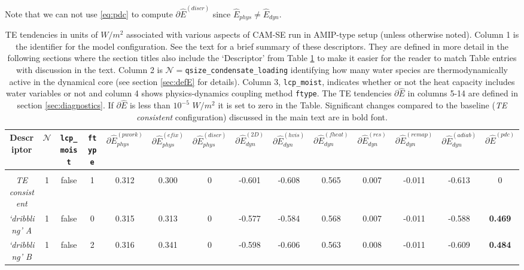 \documentclass[draft,linenumbers]{agujournal}
\newcommand*{\gi}[1]{\widehat{#1}}
\begin{document}
Note that we can not use \eqref{eq:pdc} to compute $\partial \gi{E}^{({discr})}$ since $\gi{E}_{phys}\neq \gi{E}_{dyn}$.
%
\begin{table}
  \caption{TE tendencies in units of $W/m^2$ associated with various aspects of CAM-SE run in AMIP-type setup (unless otherwise noted). Column 1 is the identifier for the model configuration. See the text for a brief summary of these descriptors. They are defined in more detail in the following sections where the section titles also include the `Descriptor' from Table \ref{table:TE} to make it easier for the reader to match Table entries with discussion in the text. Column 2 is $\mathcal{N}=${\tt{qsize\_condensate\_loading}} identifying how many water species are thermodynamically{\color{red}{/inertially}} active in the dynamical core (see section \ref{sec:defE} for details). Column 3, {\tt{lcp\_moist}}, indicates whether or not the heat capacity includes water variables or not and column 4 shows physics-dynamics coupling method {\tt{ftype}}. The TE tendencies $\partial \gi{E}$ in columns 5-14 are defined in section \ref{sec:diagnostics}. If $\partial \gi{E}$ is less than $10^{-5}$ $W/m^2$ it is set to zero in the Table. Significant changes compared to the baseline ({\em{TE consistent}} configuration) discussed in the main text are in bold font. {\color{red}{Entries marked with `-' refer to TE tendencies that can not be directly calculated with the current framework.}}}
\label{table:TE}
\begin{tabular}{c|ccc|ccc|cccccc|c}
Descriptor & $\mathcal{N}$ & {\tt{lcp\_moist}} &  {\tt{ftype}}  & $\partial \gi{E}_{phys}^{({pwork})}$ &  $\partial \gi{E}_{phys}^{({efix})}$ &  $\partial \gi{E}_{phys}^{({discr})}$ &  $\partial \gi{E}_{dyn}^{({2D})}$ & $\partial \gi{E}_{dyn}^{({hvis})}$ & $\partial \gi{E}_{dyn}^{({fheat})}$ & $\partial \gi{E}_{dyn}^{(res)}$ & $\partial \gi{E}_{dyn}^{(remap)}$ & $\partial \gi{E}_{dyn}^{(adiab)}$  & $\partial \gi{E}^{(pdc)}$\\
\hline \hline \\
{\em{TE consistent}}& 1 & false & 1 &  0.312&  0.300& 0    & -0.601& -0.608&  0.565& 0.007          & -0.011& -0.613 &  0\\
{\em{`dribbling' A}}& 1 & false & 0 &  0.315&  0.313& 0    & -0.577& -0.584&  0.568& 0.007          & -0.011& -0.588 &  {\bf{0.469}}\\
{\em{`dribbling' B}}& 1 & false & 2 &  0.316&  0.341& 0    & -0.598& -0.606&  0.563& 0.008          & -0.011& -0.609 &  {\bf{0.484}}\\

\end{tabular}
\end{table}
\end{document}
